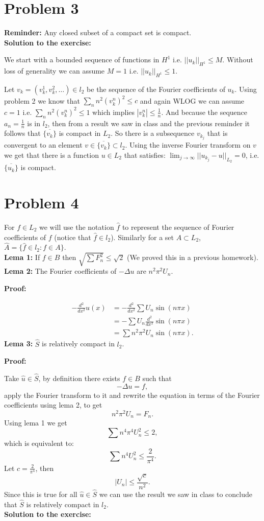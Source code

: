 \documentclass{article}
\begin{document}
\section{Problem 3}
\textbf{Reminder:} Any closed subset of a compact set is compact.\\
\textbf{Solution to the exercise:}

We start with a bounded sequence of functions in $H^1$ i.e. $||u_k||_{H^1}\leq M$.
Without loss of generality we can assume $M=1$ i.e. $||u_k||_{H^1}\leq 1$.

Let $v_k=(v_k^1,v_k^2,\dots)\in l_2$ be the sequence of the Fourier coefficients of $u_k$.
Using problem 2 we know that $\sum_nn^2(v_k^n)^2\leq c$ and again WLOG we can
assume $c=1$ i.e. $\sum_nn^2(v_k^n)^2\leq 1$ which implies $|v_k^n|\leq
\frac{1}{n}$. And because the sequence $a_n=\frac{1}{n}$ is in $l_2$, then from
a result we saw in class and the previous reminder it follows that
$\overline{\{v_k\}}$ is compact in $L_2$. So there is a subsequence $v_{k_j}$
that is convergent to an element $v\in \overline{\{v_k\}}\subset l_2$. Using
the inverse Fourier transform on $v$ we get that there is a function $u\in L_2$
that satisfies: $\lim_{j\to\infty}||u_{k_j}-u||_{L_2}=0$, i.e.
$\overline{\{u_k\}}$ is compact.
\section{Problem 4}
For $f\in L_2$ we will use the notation	$\hat f$ to represent the sequence of
Fourier coefficients of $f$ (notice that $\hat f\in l_2$). Similarly for a set
$A\subset L_2$, $\hat A=\{\hat f\in l_2:f\in A\}$.\\
\textbf{Lema 1:} If $f\in B$ then $\sqrt{\sum F_n^2}\leq \sqrt{2}$ (We proved
this in a previous
homework).\\
\textbf{Lema 2:} The Fourier coefficients of $-\Delta u$ are $n^2\pi^2 U_n$.

\textbf{Proof:}

\begin{align*}
	-\frac{d^2}{dx^2}u(x) &= -\frac{d^2}{dx^2}\sum U_n\sin(n\pi x)\\
			      &= -\sum U_n\frac{d^2}{dx^2}\sin(n\pi x)\\
	&= \sum n^2\pi^2U_n\sin(n\pi x).
\end{align*}
\textbf{Lema 3:} $\hat S$ is relatively compact in $l_2$.

\textbf{Proof:}

Take $\hat u\in \hat S$, by definition there exists $f\in B$ such that
\[
	-\Delta u =f,
\]
apply the Fourier transform to it and rewrite the equation in terms
of the Fourier coefficients using lema 2, to get
\[
	n^2\pi^2U_n = F_n.
\]
Using lema 1 we get
\[
	\sum n^4\pi^4U_n^2\leq 2,
\]
which is equivalent to:
\[
\sum n^4U_n^2\leq \frac{2}{\pi^4}.
\]
Let $c=\frac{2}{\pi^4}$, then
\[
	|U_n|\leq \frac{\sqrt{c}}{n^2}.
\]
Since this is true for all $\hat u\in \hat S$ we can use the result
we saw in class to conclude that $\hat S$ is relatively compact in $l_2$.\\
\textbf{Solution to the exercise:}
\end{document}

